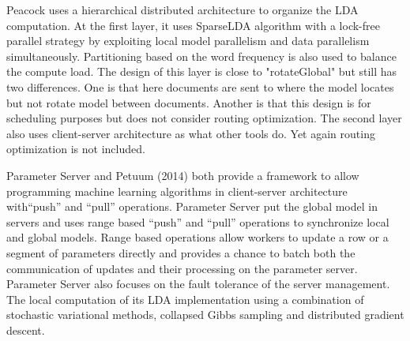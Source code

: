 \documentclass[conference]{IEEEtran}
\begin{document}
Peacock \cite{9} uses
a hierarchical distributed architecture to organize the LDA computation.
At the first layer, it uses SparseLDA algorithm with a lock-free parallel strategy 
by exploiting local model parallelism and data parallelism simultaneously. 
Partitioning based on the word frequency is also used to balance the compute load.
The design of this layer is close to "rotateGlobal" but still has two differences.
One is that here documents are sent to where the model locates but not rotate model
between documents. Another is that this design is for scheduling purposes
but does not consider routing optimization. 
The second layer also uses client-server architecture as what other tools do.
Yet again routing optimization is not included.

Parameter Server and Petuum (2014) both provide a framework to allow programming
machine learning algorithms in client-server architecture
with``push'' and ``pull'' operations.
Parameter Server put the global model in servers
and uses range based ``push'' and ``pull'' operations
to synchronize local and global models.
Range based operations allow workers to update a row
or a segment of parameters directly and provides a chance to batch
both the communication of updates and their processing on the parameter server. 
Parameter Server also focuses on the fault tolerance of the server management.
The local computation of its LDA implementation
using a combination of stochastic variational methods,
collapsed Gibbs sampling and distributed gradient descent. 
\end{document}
